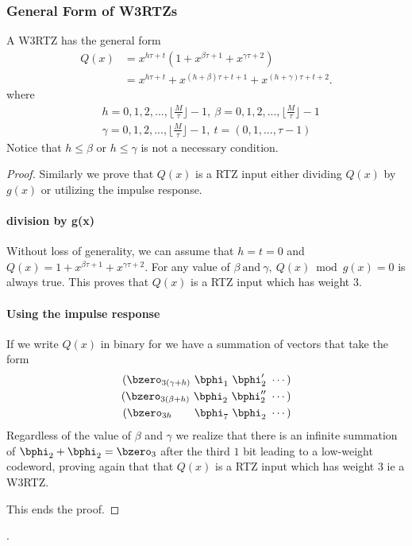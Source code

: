 \subsubsection{General Form of W3RTZs}
A W3RTZ has the general form
\begin{equation}
\begin{split}
Q(x) &=x^{h\tau+t}(1+x^{\beta \tau +1}+x^{\gamma \tau +2})\\
&=x^{h\tau+t}+x^{(h+\beta) \tau +t+1}+x^{(h+\gamma) \tau +t+2}. 
\end{split}
\end{equation}
where
\begin{equation*}
\begin{split}
&h=0,1,2,...,\Big \lfloor \frac{M}{\tau} \Big\rfloor-1,~
\beta=0,1,2,...,\Big \lfloor \frac{M}{\tau} \Big\rfloor-1\\
&\gamma=0,1,2,...,\Big \lfloor \frac{M}{\tau} \Big\rfloor-1,~
 t=(0,1,...,\tau-1)
 \end{split}
 \end{equation*}
Notice that $h \leq \beta$ or $h \leq \gamma$ is not a necessary condition.
	
\begin{proof}
Similarly we prove that $Q(x)$ is a RTZ input either dividing $Q(x)$ by $g(x)$ or utilizing the impulse response. 
\paragraph{division by g(x)}
Without loss of generality, we can assume that $h=t=0$ and 
$Q(x) = 1+x^{\beta \tau +1}+x^{\gamma \tau +2}$.
For any value of $\beta~\text{and}~\gamma,~Q(x) \bmod g(x) = 0$ is always true. This proves that $Q(x)$ is a RTZ input which has weight $3$.

\paragraph{Using the impulse response}
If we write $Q(x)$ in binary for we have a summation of vectors that take the form
\begin{eqnarray*}
(\bzero_{3(\gamma+h)}~\bphi_1~\bphi'_2~\cdots)\cr
(\bzero_{3(\beta+h)}~\bphi_2~\bphi''_2~\cdots)\cr
(\bzero_{3 h}~~~~~~\bphi_7~\bphi_2~\cdots)
\end{eqnarray*}
Regardless of the value of $\beta$ and $\gamma$ we realize that there is an infinite summation of $\bphi_2+\bphi_2=\bzero_3$ after the third $1$ bit leading to a low-weight codeword, proving again that that $Q(x)$ is a RTZ input which has weight $3$ ie a W3RTZ.

This ends the proof.

\end{proof}.

